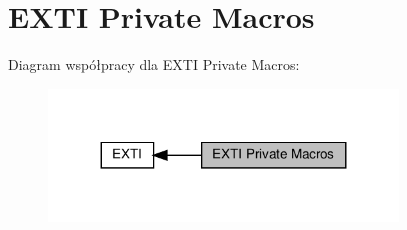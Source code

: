 \hypertarget{group___e_x_t_i___private___macros}{}\section{E\+X\+TI Private Macros}
\label{group___e_x_t_i___private___macros}
Diagram współpracy dla E\+X\+TI Private Macros\+:\nopagebreak
\begin{figure}[H]
\begin{center}
\leavevmode
\includegraphics[width=263pt]{group___e_x_t_i___private___macros}
\end{center}
\end{figure}
